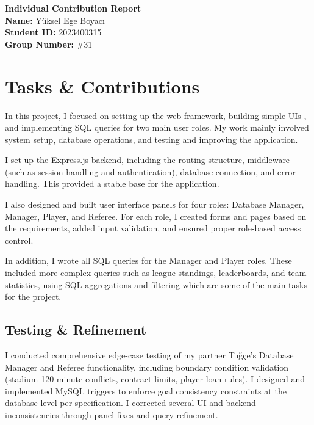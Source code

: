 \documentclass[12pt, a4paper]{article}
\begin{document}
    
    \begin{center}
        \Large\textbf{Individual Contribution Report} \\
        \vspace{0.5cm}
        \normalsize
        \textbf{Name:} Yüksel Ege Boyacı \\
        \textbf{Student ID:} 2023400315 \\
        \textbf{Group Number:} \#31
    \end{center}
    
    \vspace{0.5cm}
    
    \section*{Tasks \& Contributions}
    
    In this project, I focused on setting up the web framework, building simple UIs , and implementing SQL queries for two main user roles. My work mainly involved system setup, database operations, and testing and improving the application.
    
    I set up the Express.js backend, including the routing structure, middleware (such as session handling and authentication), database connection, and error handling. This provided a stable base for the application.
    
    I also designed and built user interface panels for four roles: Database Manager, Manager, Player, and Referee. For each role, I created forms and pages based on the requirements, added input validation, and ensured proper role-based access control.
    
    In addition, I wrote all SQL queries for the Manager and Player roles. These included more complex queries such as league standings, leaderboards, and team statistics, using SQL aggregations and filtering which are some of the main tasks for the project.
    
    \subsection*{Testing \& Refinement}
    
    I conducted comprehensive edge-case testing of my partner Tuğçe's Database Manager and Referee functionality, including boundary condition validation (stadium 120-minute conflicts, contract limits, player-loan rules). I designed and implemented MySQL triggers to enforce goal consistency constraints at the database level per specification. I corrected several UI and backend inconsistencies through panel fixes and query refinement.
    
\end{document}
